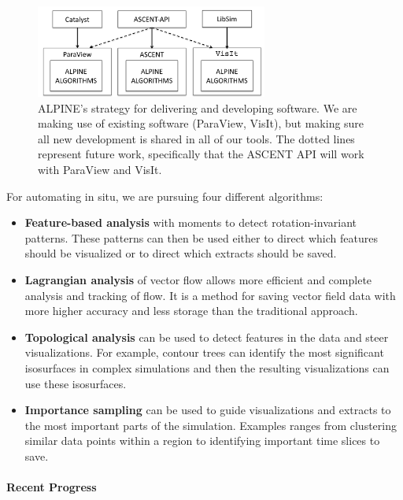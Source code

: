 \begin{figure}[htb]
	\centering
	\includegraphics[width=3in]{projects/2.3.4-DataViz/2.3.4.12-ALPINE/alpine_infrastructure.png}
	\caption{\label{fig:alpine_infrastructure}ALPINE's strategy for delivering and developing software.  We are making use of existing software (ParaView, VisIt), but making sure all new development is shared in all of our tools.  The dotted lines represent future work, specifically that the ASCENT API will work with ParaView and VisIt.}
\end{figure}

For automating in situ, we are pursuing four different algorithms:
\begin{itemize}
        \setlength{\itemsep}{1pt}
        \setlength{\parskip}{0pt}
        \setlength{\parsep}{0pt}
\item \textbf{Feature-based analysis} with moments to detect rotation-invariant patterns.  These patterns can then be used either to direct which features should be visualized or to direct which extracts should be saved.
\item \textbf{Lagrangian analysis} of vector flow allows more efficient and complete analysis and tracking of flow.  It is a method for saving vector field data with more higher accuracy and less storage than the traditional approach.
\item \textbf{Topological analysis} can be used to detect features in the data and steer visualizations.  For example, contour trees can identify the most significant isosurfaces in complex simulations and then the resulting visualizations can use these isosurfaces.
\item \textbf{Importance sampling} can be used to guide visualizations and extracts to the most important parts of the simulation.  Examples ranges from clustering similar data points within a region to identifying important time slices to save.
\end{itemize}




\paragraph{Recent Progress}

